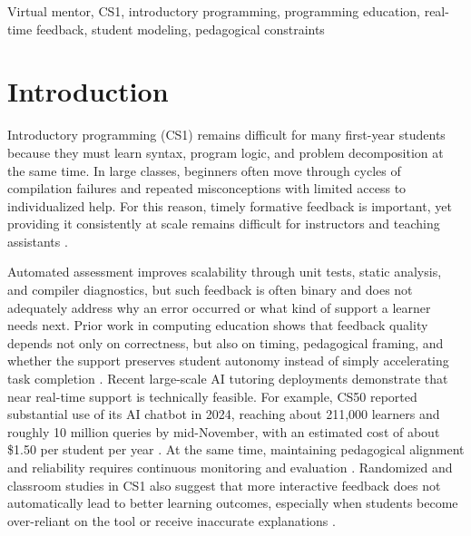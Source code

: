 \documentclass[conference]{IEEEtran}
\begin{document}
\begin{IEEEkeywords}
Virtual mentor, CS1, introductory programming, programming education, real-time feedback, student modeling, pedagogical constraints
\end{IEEEkeywords}

\section{Introduction}

Introductory programming (CS1) remains difficult for many first-year students because they must learn syntax, program logic, and problem decomposition at the same time. In large classes, beginners often move through cycles of compilation failures and repeated misconceptions with limited access to individualized help. For this reason, timely formative feedback is important, yet providing it consistently at scale remains difficult for instructors and teaching assistants \cite{DesirableCharacteristicsforAITeachingAssistantsinProgrammingEducation,FeasibilityStudyofAugmentingTeachingAssistantswithAI}.

Automated assessment improves scalability through unit tests, static analysis, and compiler diagnostics, but such feedback is often binary and does not adequately address why an error occurred or what kind of support a learner needs next. Prior work in computing education shows that feedback quality depends not only on correctness, but also on timing, pedagogical framing, and whether the support preserves student autonomy instead of simply accelerating task completion \cite{SystematicLiteratureReviewonLLM,DesirableCharacteristicsforAITeachingAssistantsinProgrammingEducation}. Recent large-scale AI tutoring deployments demonstrate that near real-time support is technically feasible. For example, CS50 reported substantial use of its AI chatbot in 2024, reaching about 211{,}000 learners and roughly 10 million queries by mid-November, with an estimated cost of about \$1.50 per student per year \cite{ImprovingAIinCS50}. At the same time, maintaining pedagogical alignment and reliability requires continuous monitoring and evaluation \cite{ImprovingAIinCS50}. Randomized and classroom studies in CS1 also suggest that more interactive feedback does not automatically lead to better learning outcomes, especially when students become over-reliant on the tool or receive inaccurate explanations \cite{FeasibilityStudyofAugmentingTeachingAssistantswithAI,SystematicLiteratureReviewonLLM,PatternsofLLMPoweredProgrammingAssistant}.
\end{document}
